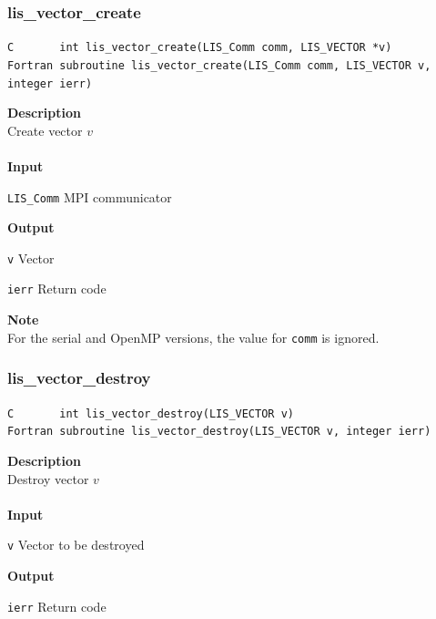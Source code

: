 \documentclass[a4paper]{article}
\newcommand{\namelistlabel}[1]{\mbox{#1}\hfill}
\newenvironment{namelist}[1]{%
 \begin{list}{}
  {\let\makelabel\namelistlabel
  \settowidth{\labelwidth}{#1}
  \setlength{\leftmargin}{1.1\labelwidth}}
}{%
\end{list}}
\begin{document}
\subsubsection{lis\_vector\_create}
\begin{screen}
\verb|C       int lis_vector_create(LIS_Comm comm, LIS_VECTOR *v)|\\
\verb|Fortran subroutine lis_vector_create(LIS_Comm comm, LIS_VECTOR v, integer ierr)| 
\end{screen}
{\bf Description}\\
\indent
Create vector $v$ 
\\ \\
\noindent
{\bf Input}
\begin{namelist}{XXXXXXXXXXXXXXXXXXXX}
\item[\tt LIS\_Comm] MPI communicator
\end{namelist}
{\bf Output}
\begin{namelist}{XXXXXXXXXXXXXXXXXXXX}
\item[\tt v] Vector
\item[\tt ierr] Return code
\end{namelist}
{\bf Note}\\
\indent
For the serial and OpenMP versions, the value for {\tt comm} is ignored.
\newpage
  \subsubsection{lis\_vector\_destroy}
\begin{screen}
\verb|C       int lis_vector_destroy(LIS_VECTOR v)|\\
\verb|Fortran subroutine lis_vector_destroy(LIS_VECTOR v, integer ierr)|
\end{screen}
{\bf Description}\\
\indent
Destroy vector $v$ 
\\ \\
\noindent
{\bf Input}
\begin{namelist}{XXXXXXXXXXXXXXXXXXXX}
\item[\tt v] Vector to be destroyed
\end{namelist}
{\bf Output}
\begin{namelist}{XXXXXXXXXXXXXXXXXXXX}
\item[\tt ierr] Return code
\end{namelist}
\end{document}
